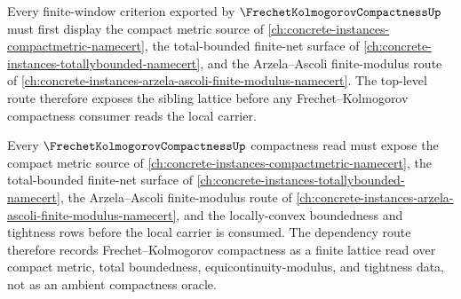 \begin{theorem}
\label{thm:frechet-kolmogorov-top-sibling-pointer}
Every finite-window criterion exported by $\FrechetKolmogorovCompactnessUp$ must first display the compact metric source of \autoref{ch:concrete-instances-compactmetric-namecert}, the total-bounded finite-net surface of \autoref{ch:concrete-instances-totallybounded-namecert}, and the Arzela--Ascoli finite-modulus route of \autoref{ch:concrete-instances-arzela-ascoli-finite-modulus-namecert}. The top-level route therefore exposes the sibling lattice before any Frechet--Kolmogorov compactness consumer reads the local carrier.
\end{theorem}

\begin{theorem}
\label{thm:frechet-kolmogorov-compactness-tightness-dependency-route}
Every $\FrechetKolmogorovCompactnessUp$ compactness read must expose the compact metric source of \autoref{ch:concrete-instances-compactmetric-namecert}, the total-bounded finite-net surface of \autoref{ch:concrete-instances-totallybounded-namecert}, the Arzela--Ascoli finite-modulus route of \autoref{ch:concrete-instances-arzela-ascoli-finite-modulus-namecert}, and the locally-convex boundedness and tightness rows before the local carrier is consumed. The dependency route therefore records Frechet--Kolmogorov compactness as a finite lattice read over compact metric, total boundedness, equicontinuity-modulus, and tightness data, not as an ambient compactness oracle.
\end{theorem}
